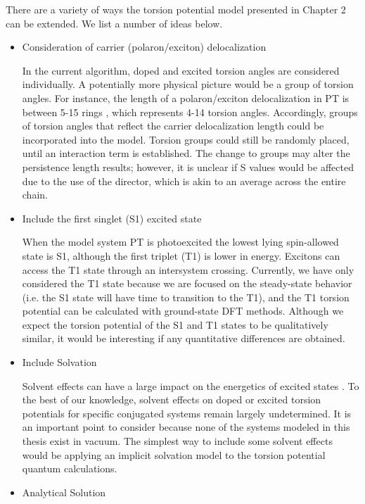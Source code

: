 There are a variety of ways the torsion potential model presented in Chapter 2 can be extended. We list a number of ideas below.

\begin{itemize}
  \item Consideration of carrier (polaron/exciton) delocalization

  In the current algorithm, doped and excited torsion angles are considered individually. A potentially more physical picture would be a group of torsion angles. For instance, the length of a polaron/exciton delocalization in PT is between 5-15 rings \cite{Salzner2014, Roseli2017, Busby2011}, which represents 4-14 torsion angles. Accordingly, groups of torsion angles that reflect the carrier delocalization length could be incorporated into the model. Torsion groups could still be randomly placed, until an interaction term is established. The change to groups may alter the persistence length results; however, it is unclear if S values would be affected due to the use of the director, which is akin to an average across the entire chain.

  \item Include the first singlet (S1) excited state

  When the model system PT is photoexcited the lowest lying spin-allowed state is S1, although the first triplet (T1) is lower in energy. Excitons can access the T1 state through an intersystem crossing. Currently, we have only considered the T1 state because we are focused on the steady-state behavior (i.e. the S1 state will have time to transition to the T1), and the T1 torsion potential can be calculated with ground-state DFT methods. Although we expect the torsion potential of the S1 and T1 states to be qualitatively similar, it would be interesting if any quantitative differences are obtained.

  \item Include Solvation

  Solvent effects can have a large impact on the energetics of excited states \cite{Blau2018}. To the best of our knowledge, solvent effects on doped or excited torsion potentials for specific conjugated systems remain largely undetermined. It is an important point to consider because none of the systems modeled in this thesis exist in vacuum. The simplest way to include some solvent effects would be applying an implicit solvation model to the torsion potential quantum calculations.

  \item Analytical Solution


\end{itemize}
